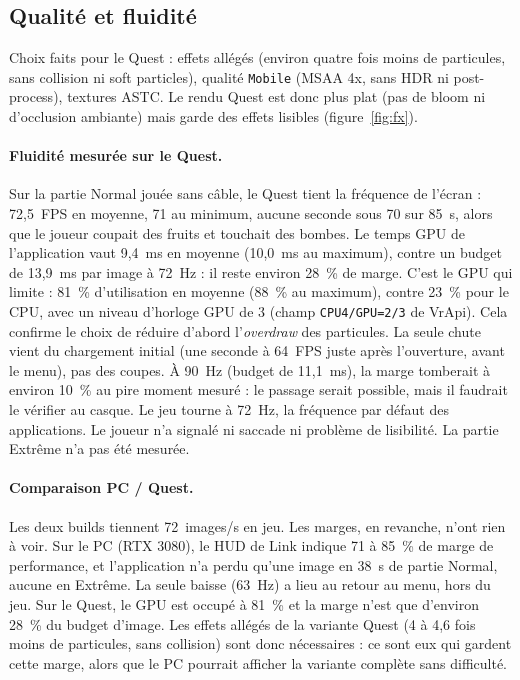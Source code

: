 \documentclass[11pt,a4paper]{article}
\begin{document}
\subsection{Qualité et fluidité}

Choix faits pour le Quest : effets allégés (environ quatre fois moins de particules, sans collision ni
soft particles), qualité \texttt{Mobile} (MSAA 4x, sans HDR ni post-process), textures ASTC. Le rendu Quest
est donc plus plat (pas de bloom ni d'occlusion ambiante) mais garde des effets lisibles
(figure~\ref{fig:fx}).

\paragraph{Fluidité mesurée sur le Quest.} Sur la partie Normal jouée sans câble, le Quest tient la
fréquence de l'écran : 72,5~FPS en moyenne, 71 au minimum, aucune seconde sous 70 sur 85~s, alors que le
joueur coupait des fruits et touchait des bombes. Le temps GPU de l'application vaut 9,4~ms en moyenne
(10,0~ms au maximum), contre un budget de 13,9~ms par image à 72~Hz : il reste environ 28~\% de marge.
C'est le GPU qui limite : 81~\% d'utilisation en moyenne (88~\% au maximum), contre 23~\% pour le CPU,
avec un niveau d'horloge GPU de 3 (champ \texttt{CPU4/GPU=2/3} de VrApi). Cela confirme le choix de réduire d'abord l'\emph{overdraw} des
particules. La seule chute vient du chargement initial (une seconde à 64~FPS juste après l'ouverture,
avant le menu), pas des coupes. À 90~Hz (budget de 11,1~ms), la marge tomberait à environ 10~\% au pire
moment mesuré : le passage serait possible, mais il faudrait le vérifier au casque. Le jeu tourne à 72~Hz,
la fréquence par défaut des applications.
Le joueur n'a signalé ni saccade ni problème de lisibilité. La partie Extrême n'a pas été mesurée.

\paragraph{Comparaison PC / Quest.} Les deux builds tiennent 72~images/s en jeu. Les marges, en
revanche, n'ont rien à voir. Sur le PC (RTX 3080), le HUD de Link indique 71 à 85~\% de marge de
performance, et l'application n'a perdu qu'une image en 38~s de partie Normal, aucune en Extrême. La
seule baisse (63~Hz) a lieu au retour au menu, hors du jeu. Sur le Quest, le GPU est occupé à 81~\% et
la marge n'est que d'environ 28~\% du budget d'image. Les effets allégés de la variante Quest
(4 à 4,6 fois moins de particules, sans collision) sont donc nécessaires : ce sont eux qui gardent cette
marge, alors que le PC pourrait afficher la variante complète sans difficulté.
\end{document}
